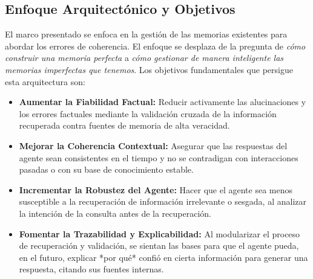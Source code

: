 \documentclass[conference]{IEEEtran}
\begin{document}
\subsection{Enfoque Arquitectónico y Objetivos}
El marco presentado se enfoca en la gestión de las memorias existentes para abordar los errores de coherencia. El enfoque se desplaza de la pregunta de \textit{cómo construir una memoria perfecta} a \textit{cómo gestionar de manera inteligente las memorias imperfectas que tenemos}. Los objetivos fundamentales que persigue esta arquitectura son:
\begin{itemize}
    \item \textbf{Aumentar la Fiabilidad Factual:} Reducir activamente las alucinaciones y los errores factuales mediante la validación cruzada de la información recuperada contra fuentes de memoria de alta veracidad.
    \item \textbf{Mejorar la Coherencia Contextual:} Asegurar que las respuestas del agente sean consistentes en el tiempo y no se contradigan con interacciones pasadas o con su base de conocimiento estable.
    \item \textbf{Incrementar la Robustez del Agente:} Hacer que el agente sea menos susceptible a la recuperación de información irrelevante o sesgada, al analizar la intención de la consulta antes de la recuperación.
    \item \textbf{Fomentar la Trazabilidad y Explicabilidad:} Al modularizar el proceso de recuperación y validación, se sientan las bases para que el agente pueda, en el futuro, explicar *por qué* confió en cierta información para generar una respuesta, citando sus fuentes internas.
\end{itemize}
\end{document}
